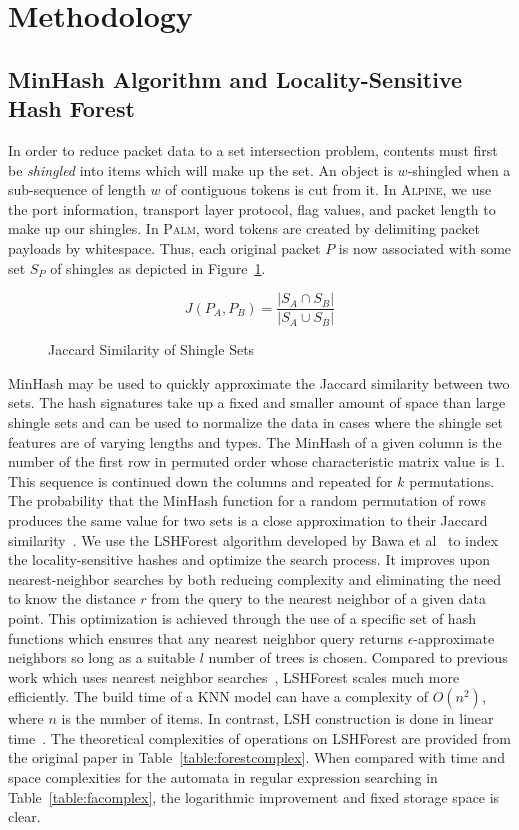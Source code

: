 \section{Methodology}

\subsection{MinHash Algorithm and Locality-Sensitive Hash Forest}

In order to reduce packet data to a set intersection problem, contents must first be \textit{shingled} into items which will make up the set. An object is $w$-shingled when a sub-sequence of length $w$ of contiguous tokens is cut from it. In \textsc{Alpine}, we use the port information, transport layer protocol, flag values, and packet length to make up our shingles. In \textsc{Palm}, word tokens are created by delimiting packet payloads by whitespace. Thus, each original packet $P$ is now associated with some set $S_P$ of shingles as depicted in Figure~\ref{jacsim}.

\begin{figure} [ht!]
\begin{equation}
J(P_A, P_B) = \frac{|S_A \cap S_B|}{|S_A \cup S_B|}
\end{equation}
\caption{Jaccard Similarity of Shingle Sets}
\label{jacsim}
\end{figure}

MinHash may be used to quickly approximate the Jaccard similarity between two sets. The hash signatures take up a fixed and smaller amount of space than large shingle sets and can be used to normalize the data in cases where the shingle set features are of varying lengths and types. The MinHash of a given column is the number of the first row in permuted order whose characteristic matrix value is $1$. This sequence is continued down the columns and repeated for $k$ permutations. The probability that the MinHash function for a random permutation of rows produces the same value for two sets is a close approximation to their Jaccard similarity~\cite{mmds}. We use the LSHForest algorithm developed by Bawa et al~\cite{lshforest} to index the locality-sensitive hashes and optimize the search process. It improves upon nearest-neighbor searches by both reducing complexity and eliminating the need to know the distance $r$ from the query to the nearest neighbor of a given data point. This optimization is achieved through the use of a specific set of hash functions which ensures that any nearest neighbor query returns $\epsilon$-approximate neighbors so long as a suitable $l$ number of trees is chosen. Compared to previous work which uses nearest neighbor searches~\cite{fpga}, LSHForest scales much more efficiently. The build time of a KNN model can have a complexity of $O(n^2)$, where $n$ is the number of items. In contrast, LSH construction is done in linear time~\cite{lshforest}. The theoretical complexities of operations on LSHForest are provided from the original paper in Table~\ref{table:forestcomplex}. When compared with time and space complexities for the automata in regular expression searching in Table~\ref{table:facomplex}, the logarithmic improvement and fixed storage space is clear.

